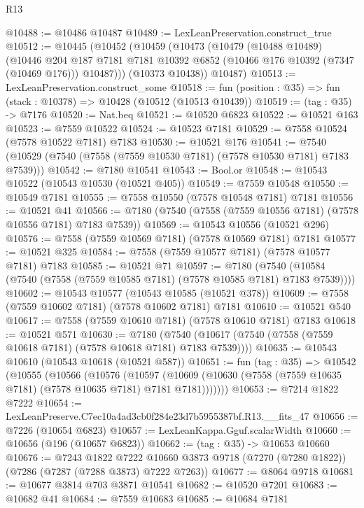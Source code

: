 \begin{lexlean}{R13}
\begin{coremodule}
@10488 := @10486 @10487
@10489 := LexLeanPreservation.construct_true
@10512 := @10445
    (@10452
      (@10459
        (@10473
          (@10479
            (@10488 @10489)
            (@10446
              @204
              @187
              @7181
              @7181
              @10392
              @6852
              (@10466 @176 @10392 (@7347 (@10469 @176)))
              @10487)))
        (@10373 @10438))
      @10487)
@10513 := LexLeanPreservation.construct_some
@10518 := fun (position : @35) => fun (stack : @10378) => @10428 (@10512 (@10513 @10439))
@10519 := (tag : @35) -> @7176
@10520 := Nat.beq
@10521 := @10520 @6823
@10522 := @10521 @163
@10523 := @7559 @10522
@10524 := @10523 @7181
@10529 := @7558 @10524 (@7578 @10522 @7181) @7183
@10530 := @10521 @176
@10541 := @7540 (@10529 (@7540 (@7558 (@7559 @10530 @7181) (@7578 @10530 @7181) @7183 @7539)))
@10542 := @7180 @10541
@10543 := Bool.or
@10548 := @10543 @10522 (@10543 @10530 (@10521 @405))
@10549 := @7559 @10548
@10550 := @10549 @7181
@10555 := @7558 @10550 (@7578 @10548 @7181) @7181
@10556 := @10521 @41
@10566 := @7180 (@7540 (@7558 (@7559 @10556 @7181) (@7578 @10556 @7181) @7183 @7539))
@10569 := @10543 @10556 (@10521 @296)
@10576 := @7558 (@7559 @10569 @7181) (@7578 @10569 @7181) @7181
@10577 := @10521 @325
@10584 := @7558 (@7559 @10577 @7181) (@7578 @10577 @7181) @7183
@10585 := @10521 @71
@10597 := @7180
    (@7540 (@10584 (@7540 (@7558 (@7559 @10585 @7181) (@7578 @10585 @7181) @7183 @7539))))
@10602 := @10543 @10577 (@10543 @10585 (@10521 @378))
@10609 := @7558 (@7559 @10602 @7181) (@7578 @10602 @7181) @7181
@10610 := @10521 @540
@10617 := @7558 (@7559 @10610 @7181) (@7578 @10610 @7181) @7183
@10618 := @10521 @571
@10630 := @7180
    (@7540 (@10617 (@7540 (@7558 (@7559 @10618 @7181) (@7578 @10618 @7181) @7183 @7539))))
@10635 := @10543 @10610 (@10543 @10618 (@10521 @587))
@10651 := fun (tag : @35) =>
  @10542
    (@10555
      (@10566
        (@10576
          (@10597
            (@10609 (@10630 (@7558 (@7559 @10635 @7181) (@7578 @10635 @7181) @7181 @7181)))))))
@10653 := @7214 @1822 @7222
@10654 := LexLeanPreserve.C7ec10a4ad3cb0f284e23d7b5955387bf.R13.__fits_47
@10656 := @7226 (@10654 @6823)
@10657 := LexLeanKappa.Gguf.scalarWidth
@10660 := @10656 (@196 (@10657 @6823))
@10662 := (tag : @35) -> @10653 @10660
@10676 := @7243
    @1822
    @7222
    @10660
    @3873
    @9718
    (@7270 (@7280 @1822))
    (@7286 (@7287 (@7288 @3873) @7222 @7263))
@10677 := @8064 @9718
@10681 := @10677 @3814 @703 @3871 @10541
@10682 := @10520 @7201
@10683 := @10682 @41
@10684 := @7559 @10683
@10685 := @10684 @7181

\end{coremodule}
\end{lexlean}
